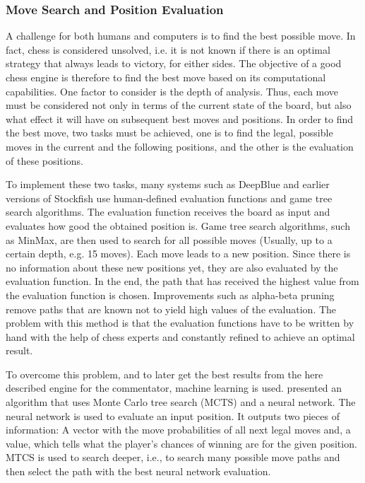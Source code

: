 \subsubsection{Move Search and Position Evaluation}

A challenge for both humans and computers is to find the best possible move. In fact, chess is considered unsolved, i.e. it is not known if there is an optimal strategy that always leads to victory, for either sides. The objective of a good chess engine is therefore to find the best move based on its computational capabilities. One factor to consider is the depth of analysis. Thus, each move must be considered not only in terms of the current state of the board, but also what effect it will have on subsequent best moves and positions. In order to find the best move, two tasks must be achieved, one is to find the legal, possible moves in the current and the following positions, and the other is the evaluation of these positions.

To implement these two tasks, many systems such as \Gls{DeepBlue} and earlier versions of \Gls{Stockfish} use human-defined evaluation functions and game tree search algorithms. The evaluation function receives the board as input and evaluates how good the obtained position is. Game tree search algorithms, such as MinMax, are then used to search for all possible moves (Usually, up to a certain depth, e.g. 15 moves). Each move leads to a new position. Since there is no information about these new positions yet, they are also evaluated by the evaluation function. In the end, the path that has received the highest value from the evaluation function is chosen. Improvements such as alpha-beta pruning remove paths that are known not to yield high values of the evaluation. The problem with this method is that the evaluation functions have to be written by hand with the help of chess experts and constantly refined to achieve an optimal result.

To overcome this problem, and to later get the best results from the here described engine for the commentator, machine learning is used. \cite{alphazero-2018} presented an algorithm that uses Monte Carlo tree search (MCTS) and a neural network. The neural network is used to evaluate an input position. It outputs two pieces of information: A vector with the move probabilities of all next legal moves and, a value, which tells what the player's chances of winning are for the given position. MTCS is used to search deeper, i.e., to search many possible move paths and then select the path with the best neural network evaluation.

